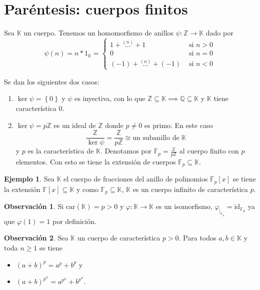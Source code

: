 \documentclass[10pt, spanish]{report}
\theoremstyle{definition}
\newtheorem*{ej}{Ejemplo}
\newtheorem*{obs}{Observación}
\newcommand{\Z}{\mathbb{Z}}
\newcommand{\Q}{\mathbb{Q}}
\newcommand{\F}{\mathbb{F}}
\newcommand{\K}{\mathbb{K}}
\newcommand{\id}{\text{id}}
\newcommand{\car}[1]{\text{car}(#1)}
\renewcommand{\geq}{\geqslant}
\begin{document}
\section{Paréntesis: cuerpos finitos}

Sea $\K$ un cuerpo. Tenemos un homomorfismo de anillos $\psi:\Z\to\K$ dado por
\[\psi(n)=n*1_\K=
    \begin{cases}
        1+\stackrel{(n)}{\ldots}+1& \text{ si } n>0\\
        0& \text{ si } n=0\\
        (-1)+\stackrel{(n)}{\ldots}+(-1)& \text{ si } n<0
    \end{cases}
\]

Se dan los siguientes dos casos:
\begin{enumerate}
    \item $\ker{\psi}=\left\{ 0 \right\}$ y $\psi$ es inyectiva, con lo que
        $\Z\subseteq\K \implies \Q\subseteq\K$ y $\K$ tiene característica 0.
    \item $\ker{\psi}=p\Z$ es un ideal de $\Z$ donde $p\neq 0$ es primo. En este
        caso \[\frac{\Z}{\ker{\psi}}=\frac{\Z}{p\Z}\cong\text{un subanillo de
        }\K\] y $p$ es la característica de $\K$. Denotamos por $\F_p=\frac{\Z}
        {p\Z}$ al cuerpo finito con $p$ elementos. Con esto se tiene la
        extensión de cuerpos $\F_p\subseteq\K$.
\end{enumerate}

\begin{ej}
    Sea $\K$ el cuerpo de fracciones del anillo de polinomios $\F_p[x]$ se tiene
    la extensión $\F[x]\subseteq\K$ y como $\F_p\subseteq\K$, $\K$ es un cuerpo
    infinito de característica $p$.
\end{ej}

\begin{obs}
    Si $\car{\K} = p>0$ y  $\varphi:\K\to\K$ es un isomorfismo,
    $\varphi_{\mid_{\F_p}}=\id_{\F_p}$ ya que $\varphi(1)=1$ por definición.
\end{obs}

\begin{obs}
    Sea $\K$ un cuerpo de característica $p>0$. Para todos $a,b\in\K$ y toda
    $n\geq1$ se tiene
    \begin{itemize}
        \item $(a+b)^p=a^p+b^p$ y
        \item $(a+b)^{p^n}=a^{p^n}+b^{p^n}$.
    \end{itemize}
\end{obs}
\end{document}
